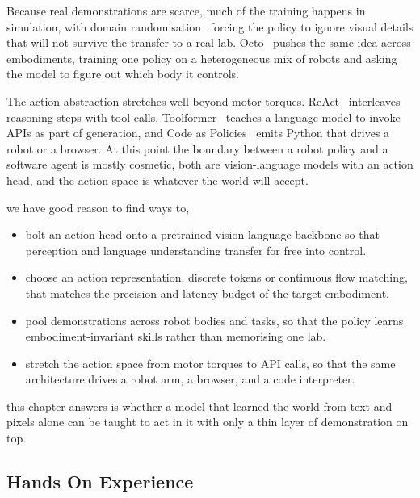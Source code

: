 Because real demonstrations are scarce, much of the training happens in simulation,
with domain randomisation~\cite{Tobin2017DomainRandomization} forcing the policy to ignore
visual details that will not survive the transfer to a real lab.
Octo~\cite{Octo2024GeneralistPolicy} pushes the same idea across embodiments,
training one policy on a heterogeneous mix of robots and asking the model to figure out which body it controls.

The action abstraction stretches well beyond motor torques.
ReAct~\cite{Yao2023ReAct} interleaves reasoning steps with tool calls,
Toolformer~\cite{Schick2023Toolformer} teaches a language model to invoke APIs as part of generation,
and Code as Policies~\cite{Liang2023CodeAsPolicies} emits Python that drives a robot or a browser.
At this point the boundary between a robot policy and a software agent is mostly cosmetic,
both are vision-language models with an action head, and the action space is whatever the world will accept.

 we have good reason to find ways to,
\begin{itemize}
    \item bolt an action head onto a pretrained vision-language backbone
    so that perception and language understanding transfer for free into control.
    \item choose an action representation, discrete tokens or continuous flow matching,
    that matches the precision and latency budget of the target embodiment.
    \item pool demonstrations across robot bodies and tasks,
    so that the policy learns embodiment-invariant skills rather than memorising one lab.
    \item stretch the action space from motor torques to API calls,
    so that the same architecture drives a robot arm, a browser, and a code interpreter.
\end{itemize}

 this chapter answers is whether a model
that learned the world from text and pixels alone
can be taught to act in it with only a thin layer of demonstration on top.

\iffalse
\subsection{Hands On Experience}


